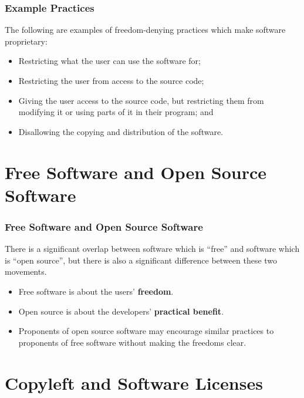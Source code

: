 \documentclass{beamer}
\begin{document}
\begin{frame}
\frametitle{Example Practices}

The following are examples of freedom-denying practices which make software 
proprietary:

\begin{itemize}
\item Restricting what the user can use the software for;
\item Restricting the user from access to the source code;
\item Giving the user access to the source code, but restricting them 
  from modifying it or using parts of it in their program; and
\item Disallowing the copying and distribution of the software.
\end{itemize}

\end{frame}


\section{Free Software and Open Source Software}

\begin{frame}
\frametitle{Free Software and Open Source Software}

There is a significant overlap between software which is ``free'' 
and software which is ``open source'', but there is also a significant 
difference between these two movements.

\begin{itemize}
\item Free software is about the users' {\bf freedom}.
\item Open source is about the developers' {\bf practical benefit}.
\item Proponents of open source software may encourage similar practices 
  to proponents of free software without making the freedoms clear.
\end{itemize}

\end{frame}


\section{Copyleft and Software Licenses}
\end{document}
